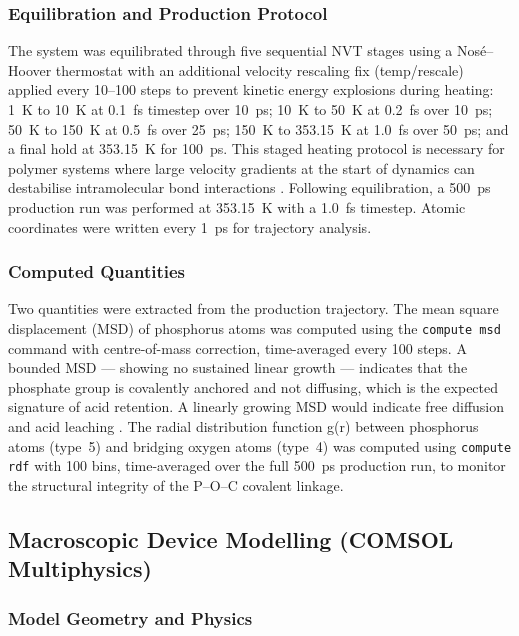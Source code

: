 \documentclass[12pt,a4paper]{report}
\begin{document}
\subsubsection{Equilibration and Production Protocol}

The system was equilibrated through five sequential NVT stages using 
a Nos\'{e}--Hoover thermostat with an additional velocity rescaling 
fix (temp/rescale) applied every 10--100 steps to prevent kinetic 
energy explosions during heating: 1~K to 10~K at 0.1~fs timestep 
over 10~ps; 10~K to 50~K at 0.2~fs over 10~ps; 50~K to 150~K at 
0.5~fs over 25~ps; 150~K to 353.15~K at 1.0~fs over 50~ps; and a 
final hold at 353.15~K for 100~ps. This staged heating protocol 
is necessary for polymer systems where large velocity gradients 
at the start of dynamics can destabilise intramolecular bond 
interactions \cite{104}. Following equilibration, a 
500~ps production run was performed at 353.15~K with a 1.0~fs 
timestep. Atomic coordinates were written every 1~ps for trajectory 
analysis.

\subsubsection{Computed Quantities}

Two quantities were extracted from the production trajectory. The 
mean square displacement (MSD) of phosphorus atoms was computed using 
the \texttt{compute msd} command with centre-of-mass correction, 
time-averaged every 100 steps. A bounded MSD — showing no sustained 
linear growth — indicates that the phosphate group is covalently 
anchored and not diffusing, which is the expected signature of acid 
retention. A linearly growing MSD would indicate free diffusion 
and acid leaching \cite{64}. The radial distribution 
function g(r) between phosphorus atoms (type~5) and bridging oxygen 
atoms (type~4) was computed using \texttt{compute rdf} with 100 bins, 
time-averaged over the full 500~ps production run, to monitor the 
structural integrity of the P--O--C covalent linkage.

\subsection{Macroscopic Device Modelling (COMSOL Multiphysics)}

\subsubsection{Model Geometry and Physics}
\end{document}
